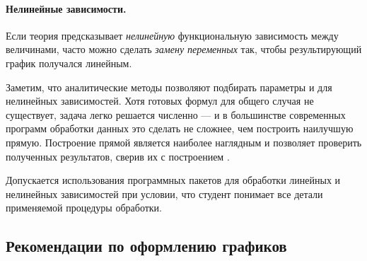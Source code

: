 \paragraph{Нелинейные зависимости.}

Если теория предсказывает \emph{нелинейную} функциональную зависимость
между величинами, часто можно сделать \emph{замену переменных} так,
чтобы результирующий график получался линейным.

Заметим, что аналитические методы позволяют подбирать параметры и для нелинейных
зависимостей. Хотя готовых формул для общего случая не существует, задача
легко решается численно --- и в большинстве современных программ обработки
данных это сделать не сложнее, чем построить наилучшую прямую.
Построение прямой является наиболее наглядным и позволяет проверить
 полученных результатов, сверив их с построением
.




Допускается использования программных пакетов для обработки линейных и нелинейных зависимостей при условии, что студент понимает все детали 
применяемой процедуры обработки.

\subsection{Рекомендации по оформлению графиков}


